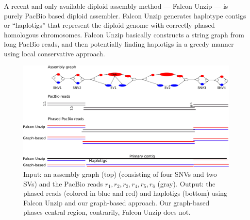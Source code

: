 A recent and only available diploid assembly method --- Falcon Unzip \citep{chin2016phased} --- is purely PacBio based diploid assembler.
Falcon Unzip generates haplotype contigs or ``haplotigs'' that represent the diploid genome with correctly phased homologous chromosomes.
Falcon Unzip basically constructs a string graph from long PacBio reads, and then potentially finding haplotigs in a greedy manner using local conservative approach.
\begin{figure}[t!]\centering
\includegraphics[width=\columnwidth]{ex_graph_approach.pdf}
\caption{Input: an assembly graph (top) (consisting of four SNVs and two SVs) and the PacBio reads $r_1, r_2, r_3, r_4, r_5, r_6$ (gray). 
Output: the phased reads (colored in blue and red) and haplotigs (bottom) using Falcon Unzip and our graph-based approach. Our graph-based phases central region, contrarily, Falcon Unzip does not.  }
\label{fig:ex_graph_approach}
\end{figure}

